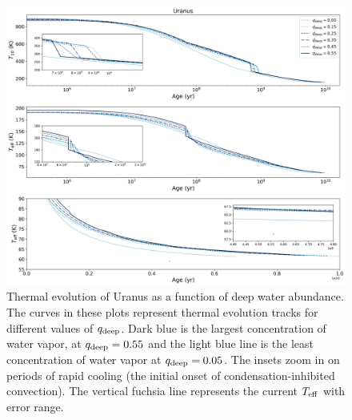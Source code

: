 \documentclass[11pt]{ucscthesisbs}
\begin{document}
\begin{figure}[ht]
 \centerline{
  \includegraphics[scale=0.45]{figures/u_cooling_curves_nz_4096_more_qdeeps.png}
 }
\caption[Thermal Evolution Curves for Uranus - Water Vapor Concentration Comparisons]
{Thermal evolution of Uranus as a function of deep water abundance. The curves in these plots represent thermal evolution tracks for different values of $q_{\rm deep}$. Dark blue is the largest concentration of water vapor, at $q_{\rm deep} = 0.55$ and the light blue line is the least concentration of water vapor at $q_{\rm deep} = 0.05$. The insets zoom in on periods of rapid cooling (the initial onset of condensation-inhibited convection). The vertical fuchsia line represents the current $T_{\rm eff}$ with error range.}
\label{fig:evolve_uranus_qdeeps}
\end{figure}

 
\end{document}

